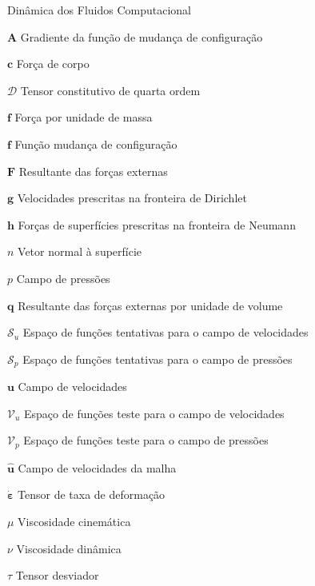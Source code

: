 \documentclass[12pt,
	openright,	%
	twoside,    %
	a4paper,			%
	sumario=tradicional,
	english,			%
	french, 			%
	brazil				%
]{USPSC}
\newcommand{\script}[1]{\mathcal{#1}}
\begin{document}
\begin{simbolos}
    \item[Dinâmica dos Fluidos Computacional]
    \item[$\mathbf{A}$] Gradiente da função de mudança de configuração
    \item[$\mathbf{c}$] Força de corpo
    \item[$\script{D}$] Tensor constitutivo de quarta ordem
    \item[$\mathbf{f}$] Força por unidade de massa
    \item[$\mathbf{f}$] Função mudança de configuração
    \item[$\mathbf{F}$] Resultante das forças externas
    \item[$\mathbf{g}$] Velocidades prescritas na fronteira de Dirichlet
    \item[$\mathbf{h}$] Forças de superfícies prescritas na fronteira de Neumann
    \item[$n$] Vetor normal à superfície
    \item[$p$] Campo de pressões
    \item[$\mathbf{q}$] Resultante das forças externas por unidade de volume
    \item[$\script{S}_u$] Espaço de funções tentativas para o campo de velocidades
    \item[$\script{S}_p$] Espaço de funções tentativas para o campo de pressões
    \item[$\mathbf{u}$] Campo de velocidades
    \item[$\script{V}_u$] Espaço de funções teste para o campo de velocidades
    \item[$\script{V}_p$] Espaço de funções teste para o campo de pressões
    \item[$\mathbf{\hat{u}}$] Campo de velocidades da malha
    \item[$\mathbf{\dot{\varepsilon}}$] Tensor de taxa de deformação
    \item[$\mu$] Viscosidade cinemática
    \item[$\nu$] Viscosidade dinâmica
    \item[$\tau$] Tensor desviador


\end{simbolos}
\end{document}
